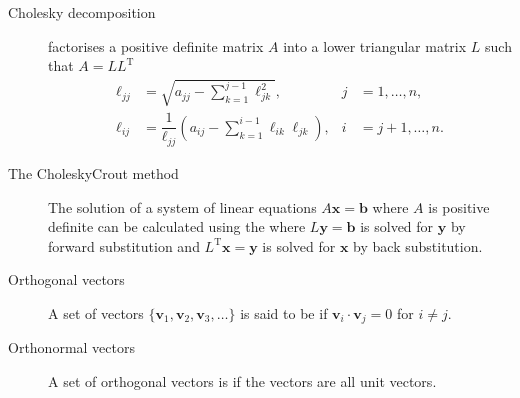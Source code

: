 \documentclass[letterpaper,10pt,english]{jupyterBook}
\begin{document}
\begin{description}
\item[{Cholesky decomposition\label{\detokenize{8_Appendices/8.0_Cheat_sheet:term-Cholesky-decomposition}}}] \leavevmode
\sphinxAtStartPar
{\hyperref[\detokenize{6_Direct_methods/6.3_Cholesky_decomposition:cholesky-definition}]{}} factorises a positive definite matrix \(A\) into a lower triangular matrix \(L\) such that \(A = LL^\mathrm{T}\)
\begin{align*}
    \ell_{jj} &= \sqrt{a_{jj} - \sum_{k=1}^{j-1} \ell_{jk}^2 }, & j &= 1, \ldots, n,\\
    \ell_{ij} &= \dfrac{1}{\ell_{jj} }\left(a_{ij} -\displaystyle \sum_{k=1}^{i-1} \ell_{ik} \ell_{jk} \right), & i &= j + 1,\ldots ,n.
\end{align*}
\item[{The Cholesky\sphinxhyphen{}Crout method\label{\detokenize{8_Appendices/8.0_Cheat_sheet:term-The-Cholesky-Crout-method}}}] \leavevmode
\sphinxAtStartPar
The solution of a system of linear equations \(A \mathbf{x} = \mathbf{b}\) where \(A\) is positive definite can be calculated using the {\hyperref[\detokenize{6_Direct_methods/6.3_Cholesky_decomposition:cholesky-crout-method-section}]{}} where \(L \mathbf{y} = \mathbf{b}\) is solved for \(\mathbf{y}\) by forward substitution and \(L^\mathrm{T} \mathbf{x} = \mathbf{y}\) is solved for \(\mathbf{x}\) by back substitution.

\item[{Orthogonal vectors\label{\detokenize{8_Appendices/8.0_Cheat_sheet:term-Orthogonal-vectors}}}] \leavevmode
\sphinxAtStartPar
A set of vectors \(\lbrace \mathbf{v}_1 ,\mathbf{v}_2 ,\mathbf{v}_3 ,\dots \rbrace\) is said to be {\hyperref[\detokenize{6_Direct_methods/6.4_QR_decomposition:qr-section}]{}} if \(\mathbf{v}_i \cdot \mathbf{v}_j =0\) for \(i\not= j\).

\item[{Orthonormal vectors\label{\detokenize{8_Appendices/8.0_Cheat_sheet:term-Orthonormal-vectors}}}] \leavevmode
\sphinxAtStartPar
A set of orthogonal vectors is {\hyperref[\detokenize{6_Direct_methods/6.4_QR_decomposition:qr-section}]{}} if the vectors are all unit vectors.


\end{description}
\end{document}
